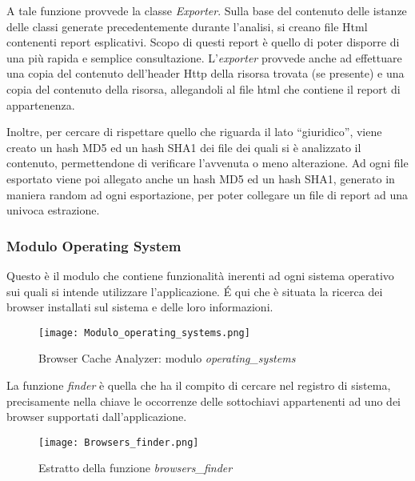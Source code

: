 A tale funzione provvede la classe \textit{Exporter}. Sulla base del contenuto delle istanze delle classi generate precedentemente durante l'analisi, si creano file Html contenenti report esplicativi. Scopo di questi report è quello di poter disporre di una più rapida e semplice consultazione.
L'\textit{exporter} provvede anche ad effettuare una copia del contenuto dell'header Http della risorsa trovata (se presente) e una copia del contenuto della risorsa, allegandoli al file html che contiene il report di appartenenza.

Inoltre, per cercare di rispettare quello che riguarda il lato ``giuridico'', viene creato un hash MD5 ed un hash SHA1 dei file dei quali si è analizzato il contenuto, permettendone di verificare l'avvenuta o meno alterazione. Ad ogni file esportato viene poi allegato anche un hash MD5 ed un hash SHA1, generato in maniera random ad ogni esportazione, per poter collegare un file di report ad una univoca estrazione. 

\clearpage

\subsubsection{Modulo Operating System}
Questo è il modulo che contiene funzionalità inerenti ad ogni sistema operativo sui quali si intende utilizzare l'applicazione. \'E qui che è situata la ricerca dei browser installati sul sistema e delle loro informazioni.

\begin{figure}[htpb]
	\begin{center}
		\texttt{[image: Modulo\_operating\_systems.png]}
	\end{center}
	\caption[Browser Cache Analyzer: modulo \textit{operating\_systems}]{Browser Cache Analyzer: modulo \textit{operating\_systems}}
\end{figure}

La funzione \textit{finder} è quella che ha il compito di cercare nel registro di sistema, precisamente nella chiave \texttt{} le occorrenze delle sottochiavi appartenenti ad uno dei browser supportati dall'applicazione.

\begin{figure}[htpb]
	\begin{center}
		\texttt{[image: Browsers\_finder.png]}
	\end{center}
	\caption[Estratto della funzione \textit{browsers\_finder}]{Estratto della funzione \textit{browsers\_finder}}
\end{figure}

